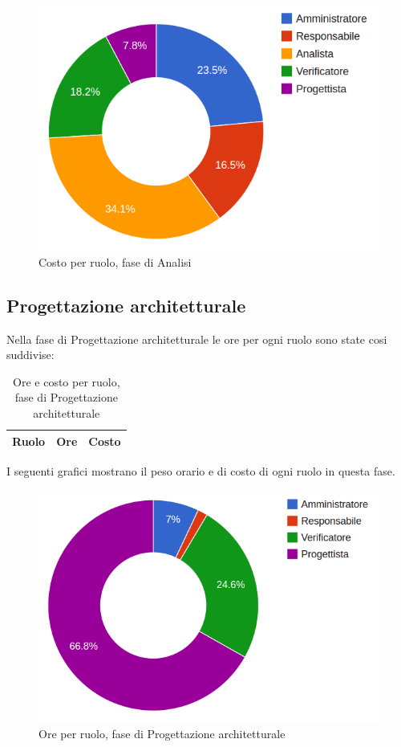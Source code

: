 \begin{figure}[H]
\centering
\includegraphics[scale=0.35]{5-1-2.png}
\caption{Costo per ruolo, fase di Analisi\label{fig:nome}}
\end{figure}

\subsection{Progettazione architetturale}

Nella fase di Progettazione architetturale le ore per ogni ruolo sono state cosi suddivise:

\begin{table}[H]
	\centering
	\begin{tabular}{ l c c }
	\textbf{Ruolo} & \textbf{Ore} & \textbf{Costo} \\
	\hline
	
		
	
	\end{tabular}
	\caption{Ore e costo per ruolo, fase di Progettazione architetturale}
	\end{table}
	
I seguenti grafici mostrano il peso orario e di costo di ogni ruolo in questa fase.

\begin{figure}[H]
\centering
\includegraphics[scale=0.35]{5-2-1.png}
\caption{Ore per ruolo, fase di Progettazione architetturale\label{fig:nome}}
\end{figure}

